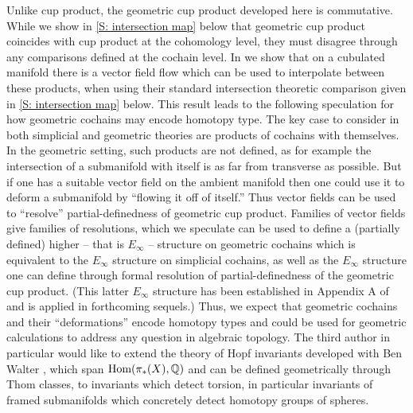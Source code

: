 Unlike cup product, the geometric cup product developed here is commutative.
While we show in \cref{S: intersection map} below that geometric cup product coincides with cup product at the cohomology level, they must disagree through any comparisons defined at the cochain level.
In \cite{FMS-flows} we show that on a cubulated manifold there is a vector field flow which can be used to interpolate between these products, when using their standard intersection theoretic comparison given in \cref{S: intersection map} below.
This result leads to the following speculation for how geometric cochains may encode homotopy type.
The key case to consider in both simplicial and geometric theories are products of cochains with themselves.
In the geometric setting, such products are not defined, as for example the intersection of a submanifold with itself is as far from transverse as possible.
But if one has a suitable vector field on the ambient manifold then one could use it to deform a submanifold by ``flowing it off of itself.''
Thus vector fields can be used to ``resolve'' partial-definedness of geometric cup product.
Families of vector fields give families of resolutions, which we speculate can be used to define a (partially defined) higher -- that is $E_\infty$ -- structure on geometric cochains which is equivalent to the $E_\infty$ structure on simplicial cochains, as well as the $E_\infty$ structure one can define through formal resolution of partial-definedness of the geometric cup product.
(This latter $E_\infty$ structure has been established in Appendix A of \cite{FGKSW} and is applied in forthcoming sequels.)
Thus, we expect that geometric cochains and their ``deformations'' encode homotopy types and could be used for geometric calculations to address any question in algebraic topology.
The third author in particular would like to extend the theory of Hopf invariants developed with Ben Walter \cite{SiWa13}, which span $\textup{Hom}(\pi_*(X), \mathbb{Q})$ and can be defined geometrically through Thom classes, to invariants which detect torsion, in particular invariants of framed submanifolds which concretely detect homotopy groups of spheres.


